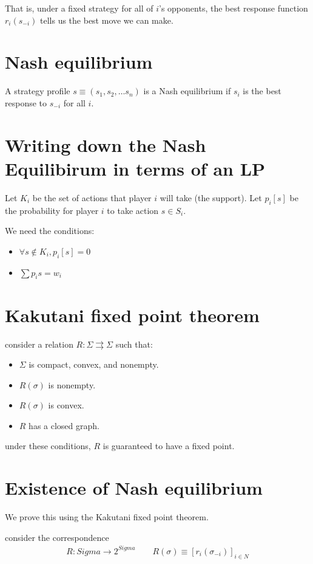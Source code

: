 \documentclass[11pt]{book}
\begin{document}
That is, under a fixed strategy for all of $i$'s opponents, the best response
function $r_i(s_{-i})$ tells us the best move we can make.


\section{Nash equilibrium}

A strategy profile $s \equiv (s_1, s_2, \dots s_n)$ is a Nash equilibrium
if $s_i$ is the best response to $s_{-i}$ for all $i$.


\section{Writing down the Nash Equilibirum in terms of an LP}
Let $K_i$ be the set of actions that player $i$ will take (the support).
Let $p_i[s]$ be the probability for player $i$ to take action $s \in S_i$.

We need the conditions:
\begin{itemize}
    \item $\forall s \not \in K_i, p_i[s] = 0$
    \item $\sum p_i s = w_i$
\end{itemize}


\section{Kakutani fixed point theorem}
consider a relation $R: \Sigma \rightrightarrows \Sigma$ such that:
\begin{itemize}
    \item $\Sigma$ is compact, convex, and nonempty.
    \item $R(\sigma)$ is nonempty.
    \item $R(\sigma)$ is convex.
    \item $R$ has a closed graph.
\end{itemize}

under these conditions, $R$ is guaranteed to have a fixed point.

\section{Existence of Nash equilibrium}
We prove this using the Kakutani fixed point theorem.

consider the correspondence
\begin{align*}
    R: Sigma \rightarrow 2^{Sigma} \qquad R(\sigma) \equiv [r_i(\sigma_{-i})]_{i \in N}
\end{align*}
\end{document}
